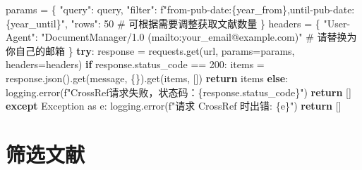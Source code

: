 \documentclass[
  letterpaper,
  DIV=11,
  numbers=noendperiod]{scrreprt}
\newenvironment{Shaded}{\begin{snugshade}}{\end{snugshade}}
\newcommand{\CommentTok}[1]{\textcolor[rgb]{0.37,0.37,0.37}{#1}}
\newcommand{\ControlFlowTok}[1]{\textcolor[rgb]{0.00,0.23,0.31}{\textbf{#1}}}
\newcommand{\DecValTok}[1]{\textcolor[rgb]{0.68,0.00,0.00}{#1}}
\newcommand{\ImportTok}[1]{\textcolor[rgb]{0.00,0.46,0.62}{#1}}
\newcommand{\NormalTok}[1]{\textcolor[rgb]{0.00,0.23,0.31}{#1}}
\newcommand{\OperatorTok}[1]{\textcolor[rgb]{0.37,0.37,0.37}{#1}}
\newcommand{\PreprocessorTok}[1]{\textcolor[rgb]{0.68,0.00,0.00}{#1}}
\newcommand{\SpecialCharTok}[1]{\textcolor[rgb]{0.37,0.37,0.37}{#1}}
\newcommand{\SpecialStringTok}[1]{\textcolor[rgb]{0.13,0.47,0.30}{#1}}
\newcommand{\StringTok}[1]{\textcolor[rgb]{0.13,0.47,0.30}{#1}}
\begin{document}
\begin{Shaded}
\begin{Highlighting}[]
\NormalTok{    params }\OperatorTok{=}\NormalTok{ \{}
        \StringTok{"query"}\NormalTok{: query,}
        \StringTok{"filter"}\NormalTok{: }\SpecialStringTok{f"from{-}pub{-}date:}\SpecialCharTok{\{}\NormalTok{year\_from}\SpecialCharTok{\}}\SpecialStringTok{,until{-}pub{-}date:}\SpecialCharTok{\{}\NormalTok{year\_until}\SpecialCharTok{\}}\SpecialStringTok{"}\NormalTok{,}
        \StringTok{"rows"}\NormalTok{: }\DecValTok{50}  \CommentTok{\# 可根据需要调整获取文献数量}
\NormalTok{    \}}
\NormalTok{    headers }\OperatorTok{=}\NormalTok{ \{}
        \StringTok{"User{-}Agent"}\NormalTok{: }\StringTok{"DocumentManager/1.0 (mailto:your\_email@example.com)"}  \CommentTok{\# 请替换为你自己的邮箱}
\NormalTok{    \}}
    \ControlFlowTok{try}\NormalTok{:}
\NormalTok{        response }\OperatorTok{=}\NormalTok{ requests.get(url, params}\OperatorTok{=}\NormalTok{params, headers}\OperatorTok{=}\NormalTok{headers)}
        \ControlFlowTok{if}\NormalTok{ response.status\_code }\OperatorTok{==} \DecValTok{200}\NormalTok{:}
\NormalTok{            items }\OperatorTok{=}\NormalTok{ response.json().get(}\StringTok{\textquotesingle{}message\textquotesingle{}}\NormalTok{, \{\}).get(}\StringTok{\textquotesingle{}items\textquotesingle{}}\NormalTok{, [])}
            \ControlFlowTok{return}\NormalTok{ items}
        \ControlFlowTok{else}\NormalTok{:}
\NormalTok{            logging.error(}\SpecialStringTok{f"CrossRef请求失败，状态码：}\SpecialCharTok{\{}\NormalTok{response}\SpecialCharTok{.}\NormalTok{status\_code}\SpecialCharTok{\}}\SpecialStringTok{"}\NormalTok{)}
            \ControlFlowTok{return}\NormalTok{ []}
    \ControlFlowTok{except} \PreprocessorTok{Exception} \ImportTok{as}\NormalTok{ e:}
\NormalTok{        logging.error(}\SpecialStringTok{f"请求 CrossRef 时出错: }\SpecialCharTok{\{}\NormalTok{e}\SpecialCharTok{\}}\SpecialStringTok{"}\NormalTok{)}
        \ControlFlowTok{return}\NormalTok{ []}
\end{Highlighting}
\end{Shaded}

\section{筛选文献}\label{ux7b5bux9009ux6587ux732e}
\end{document}
